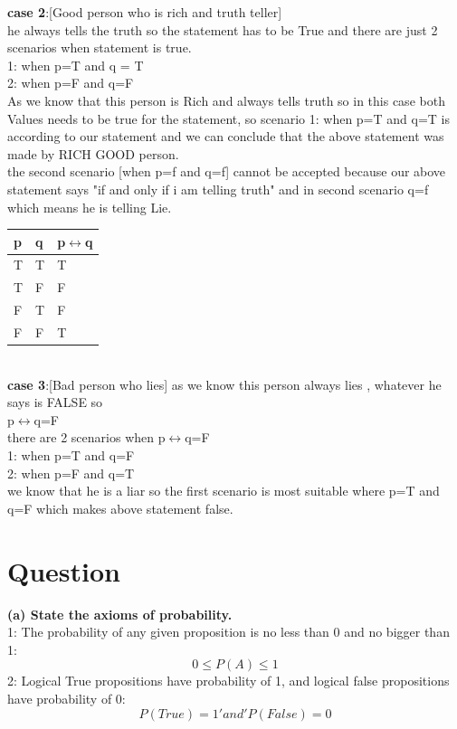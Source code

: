 \documentclass[12pt,a4paper]{article}
\begin{document}
\textbf{case 2}:[Good person who is rich and truth teller]\\

he always tells the truth so the statement has to be True and there are just 2 scenarios when statement is true.\\

1: when p=T  and q = T \\
2: when p=F and q=F \\

As we know that this person is Rich and always tells truth so in this case both Values needs to be true for the statement, so scenario 1: when p=T and q=T is according to our statement and we can conclude that the above statement was made by RICH GOOD person.\\
the second scenario [when p=f and q=f] cannot be accepted because our above statement says "if and only if i am telling truth" and in second scenario q=f which means he is telling Lie.
\begin{tabular} {|l|l||l|}
	
	\hline
	\hline
	p&q&	p$\leftrightarrow$q \\
	\hline
	\hline

	T&T&T \\
	T&F&F \\
	F&T&F \\
	F&F&T \\
	
	
\end{tabular}\\


	\textbf{case 3}:[Bad person who lies]
	as we know this person always lies , whatever he says is FALSE so\\
	p$\leftrightarrow$q=F\\
	there are 2 scenarios when 	p$\leftrightarrow$q=F\\
	1: when p=T and q=F\\
	2: when p=F and q=T \\
	
	we know that he is a liar so the first scenario is most suitable where p=T and q=F which makes above statement false.
	




		
	\section{Question}
	
    \textbf{(a)	State the axioms of probability.}\\
    1: The probability of any given proposition is no less than 0 and no bigger than 1:
    	\begin{equation*}
    	0\leqslant P(A) \leqslant 1
    	\end{equation*}
    2: Logical True propositions have probability of 1, and logical false propositions have probability of 0:
  \begin{equation*}
  P(True) = 1   'and'   P(False) = 0
  \end{equation*}
  
\end{document}
